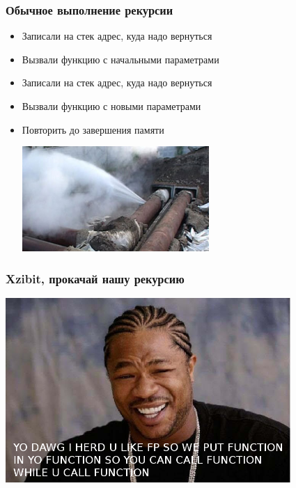 \documentclass{beamer}
\begin{document}
\begin{frame}
  \frametitle{Обычное выполнение рекурсии}
  \begin{itemize}
  \item Записали на стек адрес, куда надо вернуться
    \pause
  \item Вызвали функцию с начальными параметрами
    \pause
  \item Записали на стек адрес, куда надо вернуться
    \pause
  \item Вызвали функцию с новыми параметрами
    \pause
  \item Повторить до завершения памяти
    \begin{center}
      \includegraphics[height=4cm]{overflow.png}
    \end{center}

  \end{itemize}
\end{frame}

\begin{frame}
  \frametitle{Xzibit, прокачай нашу рекурсию}
  \includegraphics[height=7cm]{xzibit-happy.png}
\end{frame}
\end{document}
